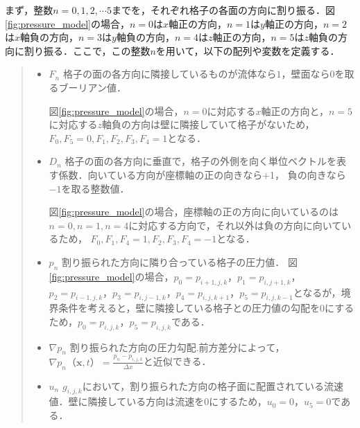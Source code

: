 \documentclass[a4j,12pt]{jreport}
\begin{document}
まず，整数$n=0,1,2,\cdots 5$までを，それぞれ格子の各面の方向に割り振る．図\ref{fig:pressure_model}の場合，$n=0$は$x$軸正の方向，$n=1$は$y$軸正の方向，$n=2$は$x$軸負の方向，$n=3$は$y$軸負の方向，$n=4$は$z$軸正の方向，$n=5$は$z$軸負の方向に割り振る．ここで，この整数$n$を用いて，以下の配列や変数を定義する．
\begin{quote}
	\begin{itemize}
		\item $F_n$ 格子の面の各方向に隣接しているものが流体なら$1$，壁面なら$0$を取るブーリアン値．
		
		図\ref{fig:pressure_model}の場合，$n=0$に対応する$x$軸正の方向と，$n=5$に対応する$z$軸負の方向は壁に隣接していて格子がないため，$F_0,F_5 = 0,F_1,F_2,F_3,F_4 = 1$となる．
		\item $D_n$ 格子の面の各方向に垂直で，格子の外側を向く単位ベクトルを表す係数．向いている方向が座標軸の正の向きなら+1，					負の向きなら$-1$を取る整数値．
		
		図\ref{fig:pressure_model}の場合，座標軸の正の方向に向いているのは$n=0,n=1,n=4$に対応する方向で，それ以外は負の方向に向いているため，
		$F_0,F_1,F_4 = 1,F_2,F_3,F_4 = -1$となる．
		\item $p_n$ 割り振られた方向に隣り合っている格子の圧力値．
		図\ref{fig:pressure_model}の場合，$p_0 = p_{i+1,j,k}$，$p_1 = p_{i,j+1,k}$，$p_2 = p_{i-1,j,k}$，$p_3 = p_{i,j-1,k}$，$p_4 = p_{i,j,k+1}$，$p_5 = p_{i,j,k-1}$となるが，境界条件を考えると，壁に隣接している格子との圧力値の勾配を$0$にするため，$p_0 = p_{i,j,k}$，$p_5 = p_{i,j,k}$である．
		\item $\nabla p_n$ 割り振られた方向の圧力勾配.前方差分によって，$\nabla p_n （\bm{x},t）  = \frac{p_n - p_{i,j,k}}{\varDelta x}$と近似できる．
		\item $u_n$ $g_{i,j,k}$において，割り振られた方向の格子面に配置されている流速値．壁に隣接している方向は流速を$0$にするため，$u_0 = 0$，$u_5 = 0$である．
	\end{itemize}
\end{quote}
\end{document}
